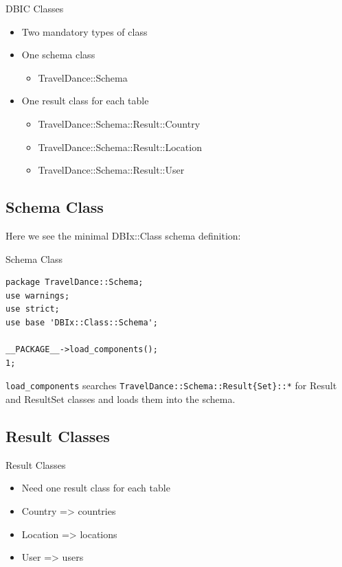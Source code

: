 \begin{frame}{DBIC Classes}
\begin{itemize}
\item Two mandatory types of class
\item One schema class
\begin{itemize}
\item TravelDance::Schema
\end{itemize}
\item One result class for each table
\begin{itemize}
\item TravelDance::Schema::Result::Country
\item TravelDance::Schema::Result::Location
\item TravelDance::Schema::Result::User
\end{itemize}
\end{itemize}
\end{frame}

\subsection{Schema Class}

Here we see the minimal DBIx::Class schema definition:

\begin{frame}[fragile]{Schema Class}
\begin{lstlisting}
package TravelDance::Schema;
use warnings;
use strict;
use base 'DBIx::Class::Schema';

__PACKAGE__->load_components();
1;
\end{lstlisting}
\end{frame}

\verb|load_components| searches \verb|TravelDance::Schema::Result{Set}::*|
for Result and ResultSet classes and loads them into the schema.

\subsection{Result Classes}

\begin{frame}{Result Classes}
\begin{itemize}
\item Need one result class for each table
\item Country => countries
\item Location => locations
\item User => users
\end{itemize}
\end{frame}

